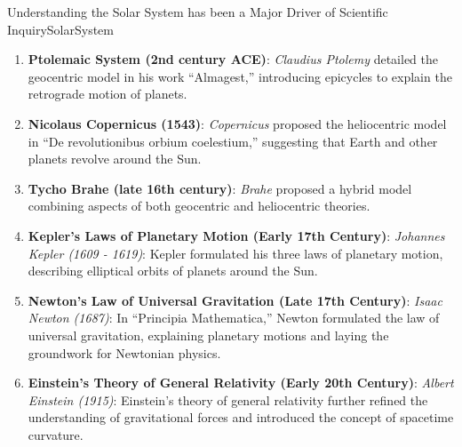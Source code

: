\begin{funColor}{Understanding the Solar System has been a Major Driver of Scientific Inquiry}{SolarSystem}
\begin{enumerate}
    \item \textbf{Ptolemaic System (2nd century ACE)}: \textit{Claudius Ptolemy} detailed the geocentric model in his work ``Almagest,'' introducing epicycles to explain the retrograde motion of planets.

    \item \textbf{Nicolaus Copernicus (1543)}: \textit{Copernicus} proposed the heliocentric model in ``De revolutionibus orbium coelestium,'' suggesting that Earth and other planets revolve around the Sun.
        
    \item \textbf{Tycho Brahe (late 16th century)}: \textit{Brahe} proposed a hybrid model combining aspects of both geocentric and heliocentric theories.

 \item \textbf{Kepler's Laws of Planetary Motion (Early 17th Century)}: \textit{Johannes Kepler (1609 - 1619)}: Kepler formulated his three laws of planetary motion, describing elliptical orbits of planets around the Sun.
    
    \item \textbf{Newton's Law of Universal Gravitation (Late 17th Century)}: \textit{Isaac Newton (1687)}: In ``Principia Mathematica,'' Newton formulated the law of universal gravitation, explaining planetary motions and laying the groundwork for Newtonian physics.

    \item \textbf{Einstein's Theory of General Relativity (Early 20th Century)}: \textit{Albert Einstein (1915)}: Einstein's theory of general relativity further refined the understanding of gravitational forces and introduced the concept of spacetime curvature.

\end{enumerate}

   
\end{funColor}


